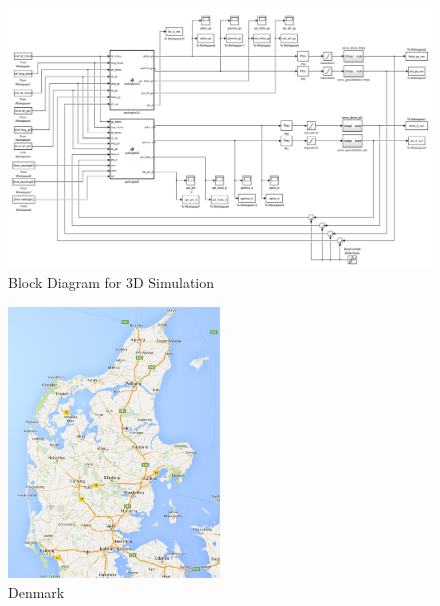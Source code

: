 \begin{figure}
	\centering
	\includegraphics[width=1.1\textwidth,height=1.1\textheight,keepaspectratio]{figures/diagram_3D.png}
	\caption{Block Diagram for 3D Simulation}
   	\label{fig:diagram3D}
\end{figure}

\begin{figure}[h]
	\centering
	\includegraphics[width=0.5\textwidth]{figures/denmark.png}
	\caption{Denmark}
   	\label{fig:denmark}
\end{figure}

